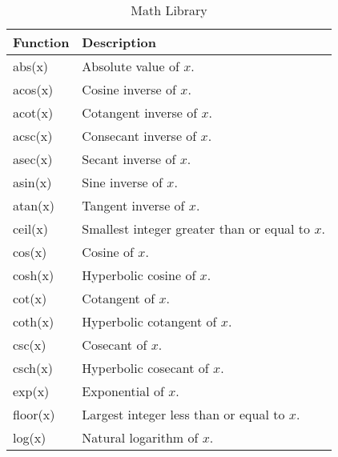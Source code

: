 \documentclass[12pt]{article}
\begin{document}
\begin{table}[ht]
\caption{Math Library}
\centering
\begin{tabular}{l | l}
\hline\hline
Function & Description                                                                            \\
\hline
abs(x)                   & Absolute value of $x$.                                                 \\
acos(x)                  & Cosine inverse of $x$.                                                 \\
acot(x)                  & Cotangent inverse of $x$.                                              \\
acsc(x)                  & Consecant inverse of $x$.                                              \\
asec(x)                  & Secant inverse of $x$.                                                 \\
asin(x)                  & Sine inverse of $x$.                                                   \\
atan(x)                  & Tangent inverse of $x$.                                                \\
ceil(x)                  & Smallest integer greater than or equal to $x$.                         \\
cos(x)                   & Cosine of $x$.                                                         \\
cosh(x)                  & Hyperbolic cosine of $x$.                                              \\
cot(x)                   & Cotangent of $x$.                                                      \\
coth(x)                  & Hyperbolic cotangent of $x$.                                           \\
csc(x)                   & Cosecant of $x$.                                                       \\
csch(x)                  & Hyperbolic cosecant of $x$.                                            \\
exp(x)                   & Exponential of $x$.                                                    \\
floor(x)                 & Largest integer less than or equal to $x$.                             \\
log(x)                   & Natural logarithm of $x$.                                              \\

\end{tabular}
\end{table}
\end{document}
